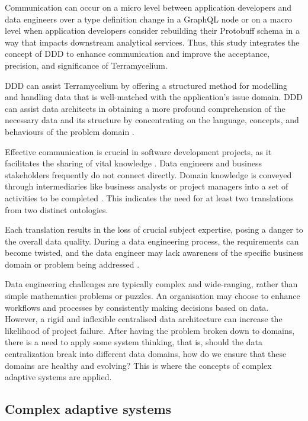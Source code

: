 \documentclass[preprint,12pt]{elsarticle}
\begin{document}
Communication can occur on a micro level between application developers and data engineers over a type definition change in a GraphQL node or on a macro level when application developers consider rebuilding their Protobuff schema in a way that impacts downstream analytical services. Thus, this study integrates the concept of DDD to enhance communication and improve the acceptance, precision, and significance of Terramycelium. 

DDD can assist Terramycelium by offering a structured method for modelling and handling data that is well-matched with the application's issue domain. DDD can assist data architects in obtaining a more profound comprehension of the necessary data and its structure by concentrating on the language, concepts, and behaviours of the problem domain \cite{DataMesh}. 

Effective communication is crucial in software development projects, as it facilitates the sharing of vital knowledge \cite{sudhakar2012model}. Data engineers and business stakeholders frequently do not connect directly. Domain knowledge is conveyed through intermediaries like business analysts or project managers into a set of activities to be completed \cite{khrononov2021learning}. This indicates the need for at least two translations from two distinct ontologies.

Each translation results in the loss of crucial subject expertise, posing a danger to the overall data quality. During a data engineering process, the requirements can become twisted, and the data engineer may lack awareness of the specific business domain or problem being addressed \cite{khononov2021learning}.

Data engineering challenges are typically complex and wide-ranging, rather than simple mathematics problems or puzzles. An organisation may choose to enhance workflows and processes by consistently making decisions based on data. However, a rigid and inflexible centralised data architecture can increase the likelihood of project failure. After having the problem broken down to domains, there is a need to apply some system thinking, that is, should the data centralization break into different data domains, how do we ensure that these domains are healthy and evolving? This is where the concepts of complex adaptive systems are applied.

\subsection{Complex adaptive systems}
\end{document}
